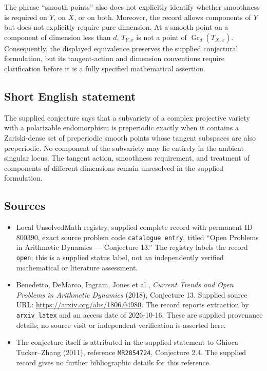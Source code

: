 \documentclass[11pt]{article}
\begin{document}
The phrase ``smooth points'' also does not explicitly identify whether smoothness is required on \(Y\), on \(X\), or on both. Moreover, the record allows components of \(Y\) but does not explicitly require pure dimension. At a smooth point on a component of dimension less than \(d\), \(T_{Y,x}\) is not a point of \(\operatorname{Gr}_d(T_{X,x})\). Consequently, the displayed equivalence preserves the supplied conjectural formulation, but its tangent-action and dimension conventions require clarification before it is a fully specified mathematical assertion.
\subsection{Short English statement}
The supplied conjecture says that a subvariety of a complex projective variety with a polarizable endomorphism is preperiodic exactly when it contains a Zariski-dense set of preperiodic smooth points whose tangent subspaces are also preperiodic. No component of the subvariety may lie entirely in the ambient singular locus. The tangent action, smoothness requirement, and treatment of components of different dimensions remain unresolved in the supplied formulation.
\subsection{Sources}
\begin{itemize}
\item Local UnsolvedMath registry, supplied complete record with permanent ID \(800390\), exact source problem code \texttt{catalogue entry}, titled ``Open Problems in Arithmetic Dynamics --- Conjecture 13.'' The registry labels the record \texttt{open}; this is a supplied status label, not an independently verified mathematical or literature assessment.
\item Benedetto, DeMarco, Ingram, Jones et al., \emph{Current Trends and Open Problems in Arithmetic Dynamics} (2018), Conjecture 13. Supplied source URL: \url{https://arxiv.org/abs/1806.04980}. The record reports extraction by \texttt{arxiv\_latex} and an access date of 2026-10-16. These are supplied provenance details; no source visit or independent verification is asserted here.
\item The conjecture itself is attributed in the supplied statement to Ghioca--Tucker--Zhang (2011), reference \texttt{MR2854724}, Conjecture 2.4. The supplied record gives no further bibliographic details for this reference.
\end{itemize}
\end{document}
